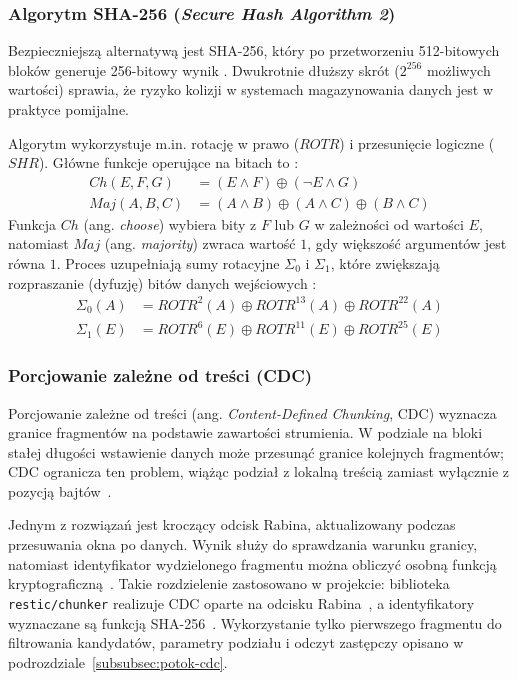 \subsubsection{Algorytm SHA-256 (\textit{Secure Hash Algorithm 2})}


Bezpieczniejszą alternatywą jest SHA-256, który po przetworzeniu 512-bitowych bloków generuje 256-bitowy wynik \cite{shs2015}. Dwukrotnie dłuższy skrót ($2^{256}$ możliwych wartości) sprawia, że ryzyko kolizji w systemach magazynowania danych jest w praktyce pomijalne.


Algorytm wykorzystuje m.in. rotację w prawo ($ROTR$) i przesunięcie logiczne ($SHR$). Główne funkcje operujące na bitach to \cite{shs2015}:
\begin{align}
    Ch(E, F, G) & = (E \wedge F) \oplus (\neg E \wedge G) \\
    Maj(A, B, C) & = (A \wedge B) \oplus (A \wedge C) \oplus (B \wedge C)
\end{align}
Funkcja $Ch$ (ang. \textit{choose}) wybiera bity z $F$ lub $G$ w zależności od wartości $E$, natomiast $Maj$ (ang. \textit{majority}) zwraca wartość $1$, gdy większość argumentów jest równa $1$. Proces uzupełniają sumy rotacyjne $\Sigma_0$ i $\Sigma_1$, które zwiększają rozpraszanie (dyfuzję) bitów danych wejściowych \cite{shs2015}:
\begin{align}
    \Sigma_0(A) & = ROTR^{2}(A) \oplus ROTR^{13}(A) \oplus ROTR^{22}(A) \\
    \Sigma_1(E) & = ROTR^{6}(E) \oplus ROTR^{11}(E) \oplus ROTR^{25}(E)
\end{align}


\subsubsection{Porcjowanie zależne od treści (CDC)}
\label{subsubsec:tech-cdc}

Porcjowanie zależne od treści (ang. \textit{Content-Defined Chunking}, CDC) wyznacza granice fragmentów na podstawie zawartości strumienia. W podziale na bloki stałej długości wstawienie danych może przesunąć granice kolejnych fragmentów; CDC ogranicza ten problem, wiążąc podział z lokalną treścią zamiast wyłącznie z pozycją bajtów~\cite{gregoriadis2024cdc}.

Jednym z rozwiązań jest kroczący odcisk Rabina, aktualizowany podczas przesuwania okna po danych. Wynik służy do sprawdzania warunku granicy, natomiast identyfikator wydzielonego fragmentu można obliczyć osobną funkcją kryptograficzną~\cite{gregoriadis2024cdc}. Takie rozdzielenie zastosowano w projekcie: biblioteka \texttt{restic/chunker} realizuje CDC oparte na odcisku Rabina~\cite{restic2026chunker}, a identyfikatory wyznaczane są funkcją SHA-256~\cite{shs2015}. Wykorzystanie tylko pierwszego fragmentu do filtrowania kandydatów, parametry podziału i odczyt zastępczy opisano w podrozdziale~\ref{subsubsec:potok-cdc}.

